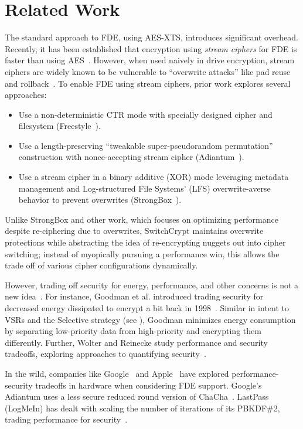 \section{Related Work}\label{sec:related}

The standard approach to FDE, using AES-XTS, introduces significant overhead.
Recently, it has been established that encryption using \emph{stream ciphers}
for FDE is faster than using AES~\cite{StrongBox, AnotherPaper1, AnotherPaper2}.
However, when used naively in drive encryption, stream ciphers are widely known
to be vulnerable to ``overwrite attacks'' like pad reuse and
rollback~\cite{KatzLindell, StrongBox}. To enable FDE using stream ciphers,
prior work explores several approaches:

\begin{itemize}
   \item Use a non-deterministic CTR mode with specially designed cipher and
   filesystem (Freestyle~\cite{Freestyle}).
   \item Use a length-preserving ``tweakable super-pseudorandom permutation''
   construction with nonce-accepting stream cipher (Adiantum~\cite{Adiantum}).
   \item Use a stream cipher in a binary additive (XOR) mode leveraging metadata
   management and Log-structured File Systems' (LFS) overwrite-averse behavior
   to prevent overwrites (StrongBox~\cite{StrongBox}).
\end{itemize}

Unlike StrongBox and other work, which focuses on optimizing performance despite
re-ciphering due to overwrites, SwitchCrypt maintains overwrite protections
while abstracting the idea of re-encrypting nuggets out into cipher switching;
instead of myopically pursuing a performance win, this allows the trade off of
various cipher configurations dynamically.

However, trading off security for energy, performance, and other concerns is not
a new idea~\cite{ScalableSecurity, WolterReinecke, ZengChow1, ZengChow2,
HaleemEtAl, LiOmiecinski}. For instance, Goodman et al. introduced trading
security for decreased energy dissipated to encrypt a bit back in
1998~\cite{ScalableSecurity}. Similar in intent to VSRs and the Selective
strategy (see ), Goodman minimizes energy consumption by
separating low-priority data from high-priority and encrypting them differently.
Further, Wolter and Reinecke study performance and security tradeoffs, exploring
approaches to quantifying security~\cite{WolterReinecke}.

In the wild, companies like Google~\cite{AndroidM} and Apple~\cite{iOSFDE} have
explored performance-security tradeoffs in hardware when considering FDE
support. Google's Adiantum uses a less secure reduced round version of
ChaCha~\cite{Adiantum}. LastPass (LogMeIn) has dealt with scaling the number of
iterations of its PBKDF\#2, trading performance for security~\cite{LastPass}.

